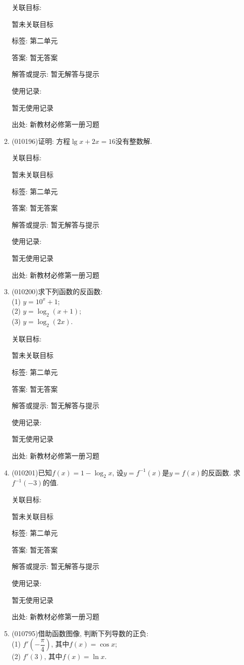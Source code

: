 \documentclass[10pt,a4paper]{article}
\begin{document}
\begin{enumerate}[1.]
关联目标:

暂未关联目标



标签: 第二单元

答案: 暂无答案

解答或提示: 暂无解答与提示

使用记录:

暂无使用记录


出处: 新教材必修第一册习题
\item { (010196)}证明: 方程$\lg x+2x=16$没有整数解.


关联目标:

暂未关联目标



标签: 第二单元

答案: 暂无答案

解答或提示: 暂无解答与提示

使用记录:

暂无使用记录


出处: 新教材必修第一册习题
\item { (010200)}求下列函数的反函数:\\
(1) $y=10^x+1$;\\
(2) $y=\log_2(x+1)$;\\
(3) $y=\log_2(2x)$.


关联目标:

暂未关联目标



标签: 第二单元

答案: 暂无答案

解答或提示: 暂无解答与提示

使用记录:

暂无使用记录


出处: 新教材必修第一册习题
\item { (010201)}已知$f(x)=1-\log_2x$, 设$y=f^{-1}(x)$是$y=f(x)$的反函数. 求$f^{-1}(-3)$的值.


关联目标:

暂未关联目标



标签: 第二单元

答案: 暂无答案

解答或提示: 暂无解答与提示

使用记录:

暂无使用记录


出处: 新教材必修第一册习题
\item { (010795)}借助函数图像, 判断下列导数的正负:\\
(1) $f'(-\dfrac \pi 4)$, 其中$f(x)=\cos x$;\\
(2) $f'(3)$, 其中$f(x)=\ln x$.



\end{enumerate}
\end{document}

